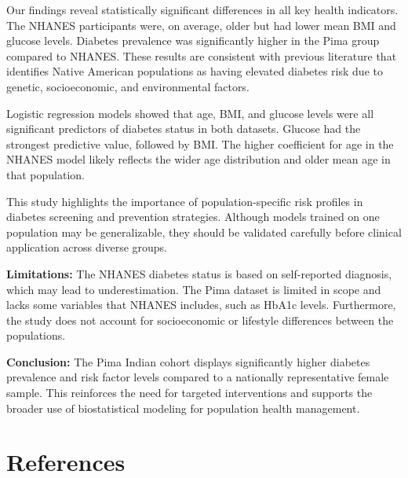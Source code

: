 \documentclass[12pt]{article}
\begin{document}
Our findings reveal statistically significant differences in all key health indicators. The NHANES participants were, on average, older but had lower mean BMI and glucose levels. Diabetes prevalence was significantly higher in the Pima group compared to NHANES. These results are consistent with previous literature that identifies Native American populations as having elevated diabetes risk due to genetic, socioeconomic, and environmental factors.

Logistic regression models showed that age, BMI, and glucose levels were all significant predictors of diabetes status in both datasets. Glucose had the strongest predictive value, followed by BMI. The higher coefficient for age in the NHANES model likely reflects the wider age distribution and older mean age in that population.

This study highlights the importance of population-specific risk profiles in diabetes screening and prevention strategies. Although models trained on one population may be generalizable, they should be validated carefully before clinical application across diverse groups.

\textbf{Limitations:} The NHANES diabetes status is based on self-reported diagnosis, which may lead to underestimation. The Pima dataset is limited in scope and lacks some variables that NHANES includes, such as HbA1c levels. Furthermore, the study does not account for socioeconomic or lifestyle differences between the populations.

\textbf{Conclusion:} The Pima Indian cohort displays significantly higher diabetes prevalence and risk factor levels compared to a nationally representative female sample. This reinforces the need for targeted interventions and supports the broader use of biostatistical modeling for population health management.

\section*{References}
\end{document}
